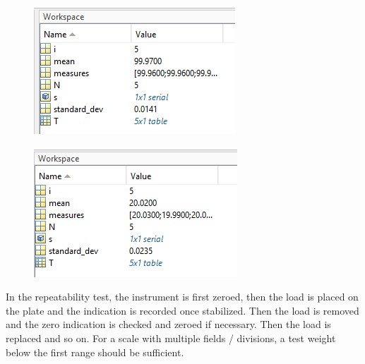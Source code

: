\begin{figure}[ht]
\centering
\begin{minipage}{.5\textwidth} %
  \centering
  \includegraphics[width=.9\linewidth]{medias/test/repeatability/repeatability_results_0.png}
  \label{fig:test1}
\end{minipage}%
\begin{minipage}{.5\textwidth} %
  \centering
  \includegraphics[width=.9\linewidth]{medias/test/repeatability/repeatability_results_1.png}
  \label{fig:test2}
\end{minipage}
\end{figure}

\noindent In the repeatability test, the instrument is first zeroed, then the load is placed on the plate and the indication is recorded once stabilized. Then the load is removed and the zero indication is checked and zeroed if necessary. Then the load is replaced and so on. For a scale with multiple fields / divisions, a test weight below the first range should be sufficient.

